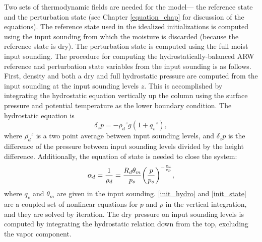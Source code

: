 Two sets of thermodynamic fields are needed for the model--- the
reference state and the perturbation state (see Chapter
\ref{equation_chap} for discussion of the equations).  The
reference state used in the idealized initializations is computed using
the input sounding from which the moisture is discarded (because the
reference state is dry).  The perturbation state is computed using the full
moist input sounding.  The procedure for computing the hydrostatically-balanced 
ARW reference and perturbation state variables from the input
sounding is as follows.  First, density and both a dry and full
hydrostatic pressure are computed from the input sounding at the input
sounding levels $z$.  This is accomplished by integrating the
hydrostatic equation vertically up the column using the surface pressure
and potential temperature as the lower boundary condition.  The
hydrostatic equation is
% 
\begin{equation} \delta_z p = - {\overline
\rho_d}^z g (1 + {\overline q_v}^z), 
\label{init_hydro}
\end{equation} 
% 
\noindent
where $\overline{\rho_d}^z$ is a two point average between input sounding
levels, and $\delta_z p$ is the difference of the pressure between input
sounding levels divided by the height difference.  Additionally, the
equation of state is needed to close the system:
% 
\begin{equation} \alpha_d = {1 \over \rho_d} = {R_d
\theta_m \over p_o} 
\biggl({p \over p_o}\biggr)^{-{c_v \over c_p}}, 
\label{init_state}
\end{equation}
%
\noindent
where $q_v$ and $\theta_m$ are given in the input sounding.
\eqref{init_hydro} and \eqref{init_state} are a coupled set of nonlinear
equations for $p$ and $\rho$ in the vertical integration, and they are
solved by iteration.  The dry pressure on input sounding levels is
computed by integrating the hydrostatic relation down from the top,
excluding the vapor component.

